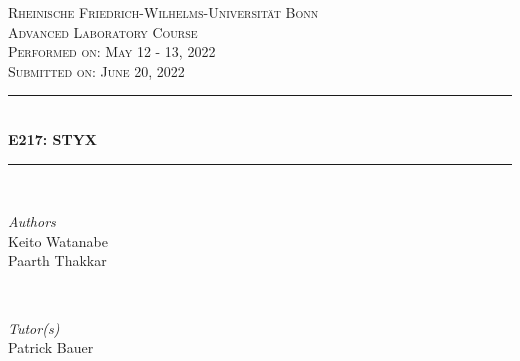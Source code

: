\documentclass[a4paper]{report}
\numberwithin{equation}{section}
\begin{document}
\begin{titlepage} %
	\newcommand{\HRule}{\rule{\linewidth}{0.5mm}} %
	
	\center %
	
	\textsc{\LARGE Rheinische Friedrich-Wilhelms-Universit\"at Bonn }\\[4cm] %
	
	\textsc{\Large Advanced Laboratory Course}\\[0.5cm] %
	
	\textsc{\large Performed on: May 12 - 13, 2022}\\[0.5cm] %

	\textsc{\large Submitted on: June 20, 2022}\\[0.5cm] %
	
	
	\HRule\\[0.4cm]
	
	{\huge\bfseries E217: STYX}\\[0.4cm] %
	
	\HRule\\[1.5cm]
	
	
	\begin{minipage}{0.4\textwidth}
		\begin{flushleft}
			\large
			\textit{Authors}\\
			Keito Watanabe \\
			Paarth Thakkar
		\end{flushleft}
	\end{minipage}
	~
	\begin{minipage}{0.4\textwidth}
		\begin{flushright}
			\large
			\textit{Tutor(s)}\\
			Patrick Bauer
		\end{flushright}
	\end{minipage}


\end{titlepage}
\end{document}
